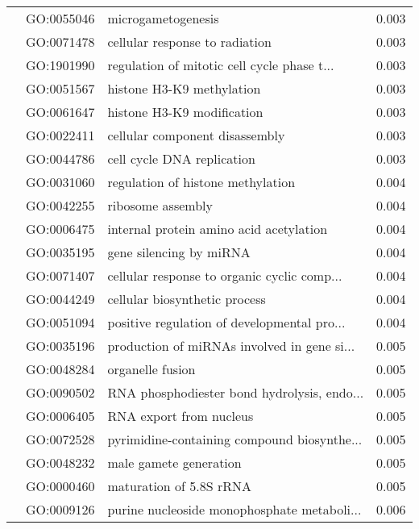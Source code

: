 \begin{longtable}{lllr}
   & GO:0055046 &                           microgametogenesis &         0.003 \\
   & GO:0071478 &               cellular response to radiation &         0.003 \\
   & GO:1901990 &  regulation of mitotic cell cycle phase t... &         0.003 \\
   & GO:0051567 &                    histone H3-K9 methylation &         0.003 \\
   & GO:0061647 &                   histone H3-K9 modification &         0.003 \\
   & GO:0022411 &               cellular component disassembly &         0.003 \\
   & GO:0044786 &                   cell cycle DNA replication &         0.003 \\
   & GO:0031060 &            regulation of histone methylation &         0.004 \\
   & GO:0042255 &                            ribosome assembly &         0.004 \\
   & GO:0006475 &      internal protein amino acid acetylation &         0.004 \\
   & GO:0035195 &                      gene silencing by miRNA &         0.004 \\
   & GO:0071407 &  cellular response to organic cyclic comp... &         0.004 \\
   & GO:0044249 &                cellular biosynthetic process &         0.004 \\
   & GO:0051094 &  positive regulation of developmental pro... &         0.004 \\
   & GO:0035196 &  production of miRNAs involved in gene si... &         0.005 \\
   & GO:0048284 &                             organelle fusion &         0.005 \\
   & GO:0090502 &  RNA phosphodiester bond hydrolysis, endo... &         0.005 \\
   & GO:0006405 &                      RNA export from nucleus &         0.005 \\
   & GO:0072528 &  pyrimidine-containing compound biosynthe... &         0.005 \\
   & GO:0048232 &                       male gamete generation &         0.005 \\
   & GO:0000460 &                      maturation of 5.8S rRNA &         0.005 \\
   & GO:0009126 &  purine nucleoside monophosphate metaboli... &         0.006 \\

\end{longtable}
